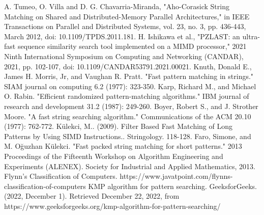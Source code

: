 \documentclass[11pt]{article}       %
\begin{document}
\begin{thebibliography}{99}
A. Tumeo, O. Villa and D. G. Chavarria-Miranda, "Aho-Corasick String Matching on Shared and Distributed-Memory Parallel Architectures," in IEEE Transactions on Parallel and Distributed Systems, vol. 23, no. 3, pp. 436-443, March 2012, doi: 10.1109/TPDS.2011.181.
H. Ishikawa et al., "PZLAST: an ultra-fast sequence similarity search tool implemented on a MIMD processor," 2021 Ninth International Symposium on Computing and Networking (CANDAR), 2021, pp. 102-107, doi: 10.1109/CANDAR53791.2021.00021.
Knuth, Donald E., James H. Morris, Jr, and Vaughan R. Pratt. "Fast pattern matching in strings." SIAM journal on computing 6.2 (1977): 323-350.
Karp, Richard M., and Michael O. Rabin. "Efficient randomized pattern-matching algorithms." IBM journal of research and development 31.2 (1987): 249-260.
Boyer, Robert S., and J. Strother Moore. "A fast string searching algorithm." Communications of the ACM 20.10 (1977): 762-772.
Külekci, M.. (2009). Filter Based Fast Matching of Long Patterns by Using SIMD Instructions.. Stringology. 118-128. 
Faro, Simone, and M. Oğuzhan Külekci. "Fast packed string matching for short patterns." 2013 Proceedings of the Fifteenth Workshop on Algorithm Engineering and Experiments (ALENEX). Society for Industrial and Applied Mathematics, 2013.
Flynn's Classification of Computers. https://www.javatpoint.com/flynns-classification-of-computers
KMP algorithm for pattern searching. GeeksforGeeks. (2022, December 1). Retrieved December 22, 2022, from https://www.geeksforgeeks.org/kmp-algorithm-for-pattern-searching/ 
\end{thebibliography}

\end{document}
